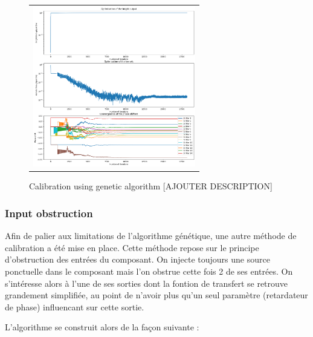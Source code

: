 \documentclass{aa}
\begin{document}
            \begin{figure}[H]
                \begin{center}
                \begin{tabular}{c}
                \includegraphics[height=7cm]{img/calibration_genetic.png}
                \end{tabular}
                \end{center}
                \caption[calibration_genetic] 
                { \label{fig:calibration_genetic} 
                Calibration using genetic algorithm [AJOUTER DESCRIPTION]}
            \end{figure}

        \subsubsection{Input obstruction}
            Afin de palier aux limitations de l'algorithme génétique, une autre méthode de calibration a été mise en place. Cette méthode repose sur le principe d'obstruction des entrées du composant. On injecte toujours une source ponctuelle dans le composant mais l'on obstrue cette fois 2 de ses entrées. On s'intéresse alors à l'une de ses sorties dont la fontion de transfert se retrouve grandement simplifiée, au point de n'avoir plus qu'un seul paramètre (retardateur de phase) influencant sur cette sortie.

            L'algorithme se construit alors de la façon suivante :
\end{document}
